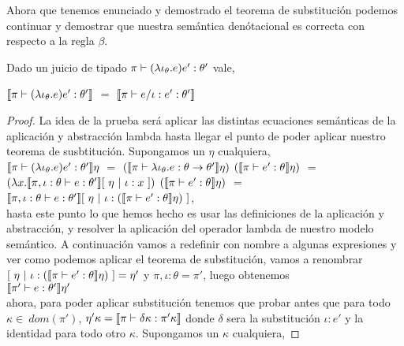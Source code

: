 Ahora que tenemos enunciado y demostrado el teorema de substituci\'on podemos
continuar y demostrar que nuestra sem\'antica den\'otacional es correcta 
con respecto a la regla $\beta$.

\begin{theorem}
Dado un juicio de tipado $\pi \vdash (\lambda \iota_{\theta} . e)e' : \theta'$ vale,

\begin{center}
$\llbracket \pi \vdash (\lambda \iota_{\theta} . e)e' : \theta' \rrbracket$ $=$
$\llbracket \pi \vdash e / \iota:e' : \theta' \rrbracket$
\end{center}

\end{theorem}
\begin{proof}

La idea de la prueba ser\'a aplicar las distintas ecuaciones sem\'anticas de la aplicaci\'on
y abstracci\'on lambda hasta llegar el punto de poder aplicar nuestro teorema de susbtituci\'on.
Supongamos un $\eta$ cualquiera,\\

$\llbracket \pi \vdash (\lambda \iota_{\theta} . e)e' : \theta' \rrbracket\eta$ $=$
$(\llbracket \pi \vdash \lambda \iota_{\theta} . e : \theta \rightarrow \theta' \rrbracket\eta)$
$(\llbracket \pi \vdash e' : \theta \rrbracket\eta)$ $=$\\

$(\lambda x . \llbracket \pi,\iota:\theta \vdash e : \theta' \rrbracket[ \ \eta \ | \ \iota:x \ ])$
$(\llbracket \pi \vdash e' : \theta \rrbracket\eta)$ $=$\\

$\semBrcks{\pi,\iota:\theta \vdash e : \theta'}[ \ \eta \ | \ 
												\iota:(\semBrcks{\pi \vdash e' : \theta}\eta) \ ]$,\\
												
hasta este punto lo que hemos hecho es usar las definiciones de la aplicaci\'on
y abstracci\'on, y resolver la aplicaci\'on del operador lambda de nuestro
modelo sem\'antico. A continuaci\'on vamos a redefinir con nombre a algunas 
expresiones y ver como podemos aplicar el teorema de substituci\'on, vamos
a renombrar $[ \ \eta \ | \ \iota:(\llbracket \pi \vdash e' : \theta \rrbracket\eta) \ ] = \eta'$
y $\pi,\iota:\theta = \pi'$, luego obtenemos\\

$\llbracket \pi' \vdash e : \theta' \rrbracket\eta'$\\

ahora, para poder aplicar substituci\'on tenemos que probar antes que
para todo $\kappa \in \ dom (\pi')$, $\eta' \kappa = \llbracket \pi \vdash \delta\kappa : \pi' \kappa \rrbracket$
donde $\delta$ sera la substituci\'on $\iota:e'$ y la identidad para todo otro $\kappa$. Supongamos
un $\kappa$ cualquiera,


\end{proof}
